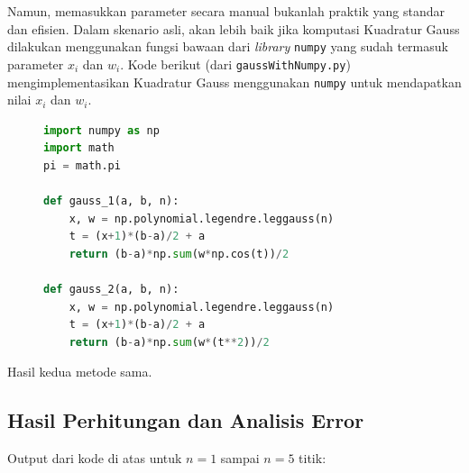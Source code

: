 \documentclass[a4paper, 11pt]{article} %
\begin{document}
Namun, memasukkan parameter secara manual bukanlah praktik yang standar dan efisien. Dalam skenario asli, akan lebih baik jika komputasi Kuadratur Gauss dilakukan menggunakan fungsi bawaan dari \textit{library} \texttt{numpy} yang sudah termasuk parameter $x_i$ dan $w_i$. Kode berikut (dari \texttt{gaussWithNumpy.py}) mengimplementasikan Kuadratur Gauss menggunakan \texttt{numpy} untuk mendapatkan nilai $x_i$ dan $w_i$. %

\begin{figure}[H]
    \centering %
    
    \begin{lstlisting}[language=Python, caption={Fungsi gaussWithNumpy.py}, label=list:gaussWithNumpy] 
import numpy as np
import math
pi = math.pi

def gauss_1(a, b, n):
    x, w = np.polynomial.legendre.leggauss(n)
    t = (x+1)*(b-a)/2 + a
    return (b-a)*np.sum(w*np.cos(t))/2

def gauss_2(a, b, n):
    x, w = np.polynomial.legendre.leggauss(n)
    t = (x+1)*(b-a)/2 + a
    return (b-a)*np.sum(w*(t**2))/2
    \end{lstlisting} 
    
\end{figure}
Hasil kedua metode sama.

\subsection{Hasil Perhitungan dan Analisis Error} %
Output dari kode di atas untuk $n=1$ sampai $n=5$ titik: %
\end{document}
